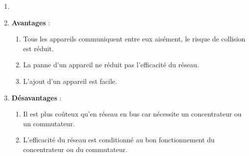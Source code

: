 \documentclass[11pt, a4paper]{book}
\begin{document}
\begin{center}
\end{center}



\begin{remarques}
\begin{enumerate}
\item[]
\item {\bf Avantages} : 
	\begin{enumerate}
		\item Tous les appareils communiquent entre eux aisément, le risque de collision est réduit.
		\item  La panne d'un appareil ne réduit pas l'efficacité du réseau.
		\item L'ajout d'un appareil est facile.\\
	\end{enumerate}
\item {\bf Désavantages} :
	\begin{enumerate}
		\item Il est plus coûteux qu'en réseau en bus car nécessite un concentrateur ou un commutateur.
		\item L'efficacité du réseau est conditionné au bon fonctionnement du concentrateur ou du commutateur.
	\end{enumerate}
\end{enumerate}
\end{remarques}
\end{document}
